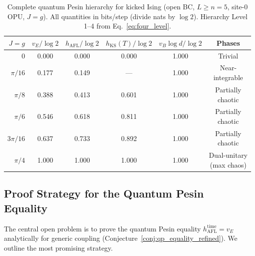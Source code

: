 \documentclass[12pt,a4paper]{article}
\begin{document}
\begin{table}[h!]
\centering
\caption{Complete quantum Pesin hierarchy for kicked Ising (open BC,
$L\geq n=5$, site-$0$ OPU, $J=g$).  All quantities in bits/step
(divide nats by $\log 2$).  Hierarchy Level 1--4 from
Eq.~\eqref{eq:four_level}.}
\label{tab:complete_hierarchy}
\begin{tabular}{r|c|c|c|c|c}
\hline
$J=g$ & $v_E/\log 2$ & $h_{\mathrm{AFL}}/\log 2$
      & $h_{\mathrm{KS}}(T)/\log 2$ & $v_B\log d/\log 2$
      & Phases \\
\hline
$0$       & 0.000 & 0.000 & 0.000 & 1.000 & Trivial \\
$\pi/16$  & 0.177 & 0.149 & ---   & 1.000 & Near-integrable \\
$\pi/8$   & 0.388 & 0.413 & 0.601 & 1.000 & Partially chaotic \\
$\pi/6$   & 0.546 & 0.618 & 0.811 & 1.000 & Partially chaotic \\
$3\pi/16$ & 0.637 & 0.733 & 0.892 & 1.000 & Partially chaotic \\
$\pi/4$   & 1.000 & 1.000 & 1.000 & 1.000 & Dual-unitary (max chaos) \\
\hline
\end{tabular}
\end{table}

\subsection{Proof Strategy for the Quantum Pesin Equality}
\label{subsec:proof_strategy}

The central open problem is to prove the quantum Pesin equality
$h_{\mathrm{AFL}}^{\mathrm{time}} = v_E$ analytically for generic
coupling (Conjecture~\ref{conj:qp_equality_refined}).
We outline the most promising strategy.
\end{document}
